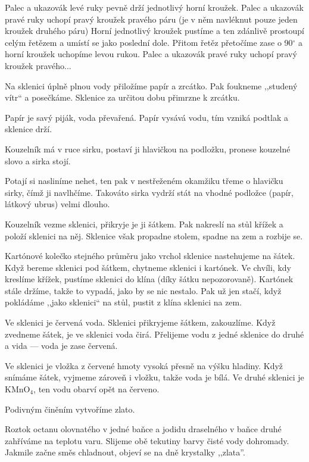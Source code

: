 Palec a ukazovák levé ruky pevně drží jednotlivý horní kroužek. 
Palec a ukazovák pravé ruky uchopí pravý kroužek pravého páru 
(je v něm navléknut pouze jeden kroužek druhého páru) Horní jednotlivý 
kroužek pustíme a ten zdánlivě prostoupí celým řetězem a umístí 
se jako poslední dole. Přitom řetěz přetočíme zase o 90$^\circ$ 
a horní kroužek uchopíme levou rukou. Palec a ukazovák pravé 
ruky uchopí pravý kroužek pravého...


Na sklenici úplně plnou vody přiložíme papír a zrcátko. 
Pak foukneme ,,studený vítr`` a posečkáme. Sklenice za určitou 
dobu přimrzne k zrcátku.

Papír je savý piják, voda převařená. Papír vysává vodu, tím 
vzniká podtlak a sklenice drží.


Kouzelník má v ruce sirku, postaví ji hlavičkou na podložku, 
pronese kouzelné slovo a sirka stojí.

Potají si nasliníme nehet, ten pak v nestřeženém okamžiku 
třeme o hlavičku sirky, čímž ji navlhčíme. Takováto sirka vydrží 
stát na vhodné podložce (papír, látkový ubrus) velmi dlouho.


Kouzelník vezme sklenici, přikryje je ji šátkem. Pak 
nakreslí na stůl křížek a položí sklenici na něj. Sklenice však 
propadne stolem, spadne na zem a rozbije se.

Kartónové kolečko stejného průměru jako vrchol sklenice nastehujeme 
na šátek. Když bereme sklenici pod šátkem, chytneme sklenici 
i kartónek. Ve chvíli, kdy kreslíme křížek, pustíme sklenici 
do klína (díky šátku nepozorovaně). Kartónek stále držíme, takže 
to vypadá, jako by se nic nestalo. Pak už jen stačí, když pokládáme 
,,jako sklenici`` na stůl, pustit z klína sklenici na zem.


Ve sklenici je červená voda. Sklenici přikryjeme šátkem, 
zakouzlíme. Když zvedneme šátek, je ve sklenici voda čirá. Přelijeme 
vodu z jedné sklenice do druhé a vida --- voda je zase červená.

Ve sklenici je vložka z červené hmoty vysoká přesně na výšku 
hladiny. Když snímáme šátek, vyjmeme zároveň i vložku, takže 
voda je bílá. Ve druhé sklenici je KMnO$_4$, ten vodu obarví opět 
na červeno.


Podivným činěním vytvoříme zlato.

Roztok octanu olovnatého v jedné baňce a jodidu draselného 
v baňce druhé zahříváme na teplotu varu. Slijeme obě tekutiny 
barvy čisté vody dohromady. Jakmile začne směs chladnout, objeví 
se na dně krystalky ,,zlata''.


